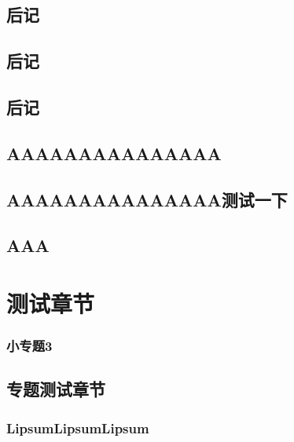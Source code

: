 \documentclass[color=green]{textbook-cn}%
\begin{document}
\chapter{后记}
\thechapter
\zhlipsum\zhlipsum


\begin{Definition}[定义名称]
	\lipsum[1]
\end{Definition}




\chapter[我爱你]{后记}
\thechapter
\zhlipsum\zhlipsum
\chapter*{后记}



\chapter*[我讨厌你]{AAAAAAAAAAAAAAA}
\zhlipsum\zhlipsum

\chapter*{AAAAAAAAAAAAAAA测试一下}

\zhlipsum\zhlipsum

\chapter*{AAA}

\zhlipsum\zhlipsum

\part[宝贝]{测试章节}


\lipsum

\begin{Definition}
\lipsum[2]
\end{Definition}

\begin{Lemma}[定义名称]
	\lipsum[2]
\end{Lemma}



\begin{Topic}

\section{小专题3}
\chapter{专题测试章节}
\section{LipsumLipsumLipsum}

\end{Topic}











\end{document}
